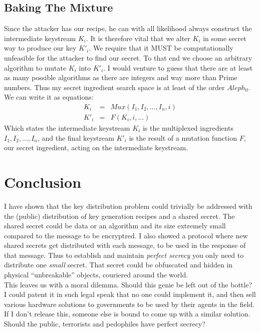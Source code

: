 \documentclass[10pt,conference,a4article]{IEEEtran}
\begin{document}
\subsection{Baking The Mixture}
Since the attacker has our recipe, he can with all likelihood always construct the 
intermediate keystream $K_i$. It is therefore vital that we alter $K_i$ in some secret
way to produce our key $K'_i$. We require that it MUST be computationally unfeasible
for the attacker to find our secret. To that end we choose an arbitrary algorithm
to mutate $K_i$ into $K'_i$. I would venture to guess that there are at least 
as many possible algorithms as there are integers and way more than Prime numbers.
Thus my secret ingredient search space is at least of the order $Aleph_0$.
\\[2ex]
We can write it as equations:
\begin{eqnarray}
K_i &=& Mux(I_1,I_2,\dots,I_n,i) \\
K'_i &=& F(K_i,i,\dots)
\end{eqnarray}
Which states the intermediate keystream $K_i$ is the multiplexed ingredients 
$I_1,I_2,\dots,I_n$, and the final keystream $K'_i$ is the result of a mutation function
$F$, our secret ingredient, acting on the intermediate keystream. 

\section{Conclusion}
I have shown that the key distribution problem could trivially be addressed with the
(public) distribution of key generation recipes and a shared secret. The shared 
secret could be data or an algorithm and its size extremely small compared to the 
message to be encryptred. I also showed a protocol where new shared secrets get 
distributed with each message, to be used in the response of that message. Thus to 
establish and maintain {\em perfect secrecy} you only need to distribute one 
{\em small} secret. That secret could be obfuscated \cite{DeCSS} and hidden
\cite{Hardware} in physical ``unbreakable'' objects, couriered around the world.
\\[2ex]
This leaves us with a moral dilemma. Should this genie be left out of the bottle? 
I could patent it in such legal speak that no one could implement it, and then sell
various hardware solutions to governments to be used by their agents in the field.
If I don't release this, someone else is bound to come up with a similar solution. 
Should the public, terrorists and pedophiles have perfect secrecy?



\end{document}
